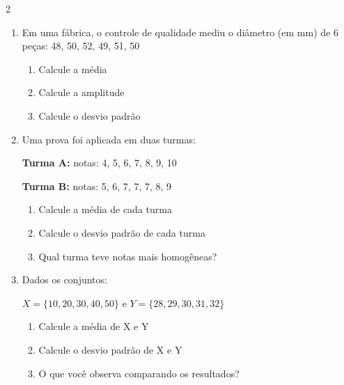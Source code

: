\documentclass[11pt]{article}
\begin{document}
\begin{multicols}{2}
\begin{enumerate}[leftmargin=*, start=7]
\item Em uma fábrica, o controle de qualidade mediu o diâmetro (em mm) de 6 peças: 48, 50, 52, 49, 51, 50
\begin{enumerate}[label=\alph*)]
\item Calcule a média
\item Calcule a amplitude
\item Calcule o desvio padrão
\end{enumerate}

\item Uma prova foi aplicada em duas turmas:

\textbf{Turma A:} notas: 4, 5, 6, 7, 8, 9, 10

\textbf{Turma B:} notas: 5, 6, 7, 7, 7, 8, 9

\begin{enumerate}[label=\alph*)]
\item Calcule a média de cada turma
\item Calcule o desvio padrão de cada turma
\item Qual turma teve notas mais homogêneas?
\end{enumerate}

\item Dados os conjuntos:

$X = \{10, 20, 30, 40, 50\}$ e $Y = \{28, 29, 30, 31, 32\}$

\begin{enumerate}[label=\alph*)]
\item Calcule a média de X e Y
\item Calcule o desvio padrão de X e Y
\item O que você observa comparando os resultados?
\end{enumerate}

\end{enumerate}

\end{multicols}
\end{document}
